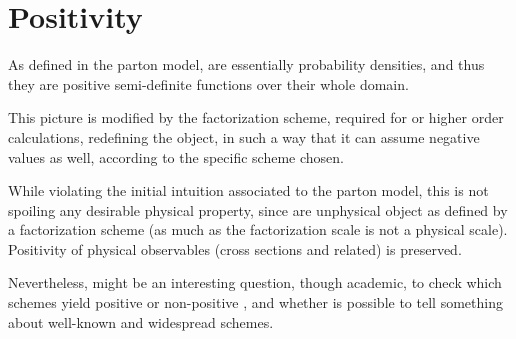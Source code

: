 
\chapter{Positivity}
\label{ch:pos}
\minitoc
\adjustmtc

\noindent
As defined in the parton model, \pdf are essentially probability densities, and
thus they are positive semi-definite functions over their whole domain.

This picture is modified by the factorization scheme, required for \nlo or
higher order calculations, redefining the \pdf object, in such a way that it
can assume negative values as well, according to the specific scheme chosen.

While violating the initial intuition associated to the parton model, this is
not spoiling any desirable physical property, since \pdf are unphysical object
as defined by a factorization scheme (as much as the factorization scale is not
a physical scale).
Positivity of physical observables (cross sections and related) is preserved. 

Nevertheless, might be an interesting question, though academic, to check which
schemes yield positive or non-positive \pdf, and whether is possible to tell
something about well-known and widespread schemes.






